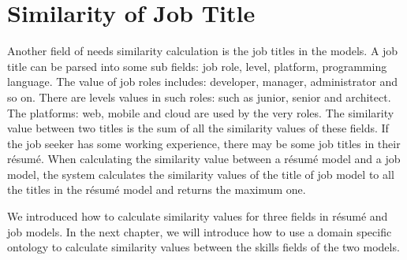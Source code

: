 \section{Similarity of Job Title}
Another field of needs similarity calculation is the job titles in the models. A job title can be parsed into some sub fields: job role, level, platform, programming language.  The value of job roles includes: developer, manager, administrator and so on. There are levels values in such roles: such as junior, senior and architect. The platforms: web, mobile and cloud are used by the very roles.  The similarity value between two titles is the sum of all the similarity values of these fields. If the job seeker has some working experience, there may be some job titles in their r\'esum\'e.  When calculating the similarity value between a r\'esum\'e model and a job model, the system calculates the similarity values of the title of job model to all the titles in the r\'esum\'e model and returns the maximum one.

We introduced how to calculate similarity values for three fields in r\'esum\'e and job models. In the next chapter, we will introduce how to use a domain specific ontology to calculate similarity values between the skills fields of the two models.

